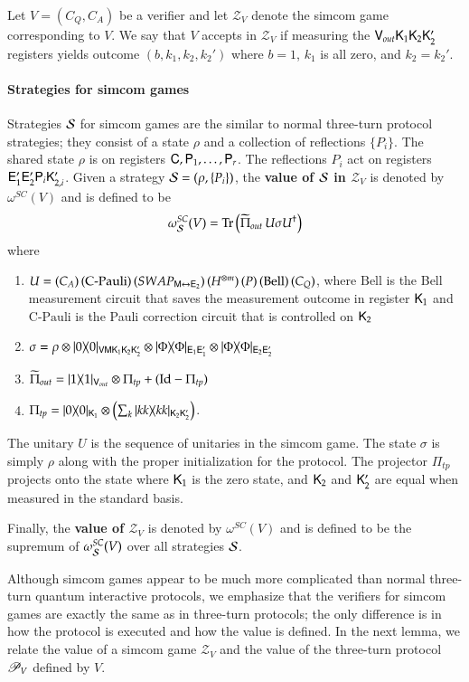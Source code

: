 Let $V = (C_Q,C_A)$ be a verifier and let $\mathscr{Z}_V$ denote the simcom game corresponding to $V$. We say that $V$ accepts in $\mathscr{Z}_V$ if measuring the ${\mathsf{V}}_{out} {\mathsf{K}}_1 {\mathsf{K}}_2 {\mathsf{K}}_2'$ registers yields outcome $(b,k_1,k_2,k_2')$ where $b = 1$, $k_1$ is all zero, and $k_2 = k_2'$. 

\paragraph{Strategies for simcom games} Strategies $\mathcal{S}$ for simcom games are the similar to normal three-turn protocol strategies; they consist of a state $\rho$ and a collection of reflections $\{ P_i \}$. The shared state $\rho$ is on registers ${\mathsf{C}}, {\mathsf{P}}_1,\ldots,{\mathsf{P}}_r$. The reflections $P_i$ act on registers ${\mathsf{E}}_1' {\mathsf{E}}_2' {\mathsf{P}}_i {\mathsf{K}}_{2,i}'$. Given a strategy $\mathcal{S} = (\rho,\{P_i\})$, the \textbf{value of $\mathcal{S}$ in $\mathscr{Z}_V$} is denoted by $\omega^{SC}(V)$ and is defined to be
\[
	\omega^{SC}_{\mathcal{S}}(V) = \operatorname{Tr} \left( \widetilde{\Pi}_{out} \, U \sigma U^\dagger\right)
\]
where
\begin{enumerate}
	\item $U =  (C_A) \,  (\text{C-Pauli}) \, (SWAP_{{\mathsf{M}} \leftrightarrow {\mathsf{E}}_2}) \, (H^{\otimes m}) \, (P)\, (\mathrm{Bell})\, (C_Q)$, where $\mathrm{Bell}$ is the Bell measurement circuit that saves the measurement outcome in register ${\mathsf{K}}_1$ and $\text{C-Pauli}$ is the Pauli correction circuit that is controlled on ${\mathsf{K}}_2$
	\item $\sigma = \rho \otimes |0\rangle\! \langle 0|_{{\mathsf{V}} {\mathsf{M}} {\mathsf{K}}_1 {\mathsf{K}}_2 {\mathsf{K}}_2'} \otimes |\Phi\rangle\! \langle \Phi|_{{\mathsf{E}}_1 {\mathsf{E}}_1'} \otimes |\Phi\rangle\! \langle \Phi|_{{\mathsf{E}}_2 {\mathsf{E}}_2'}$
	\item  $\widetilde{\Pi}_{out} = |1\rangle\! \langle 1|_{{\mathsf{V}}_{out}} \otimes \Pi_{tp} + (\mathop{\mathrm{Id}}\!\mathinner{} - \Pi_{tp})$
	\item $\Pi_{tp} = |0\rangle\! \langle 0|_{{\mathsf{K}}_1} \otimes \left( \sum_{k} |kk\rangle\! \langle kk|_{{\mathsf{K}}_2 {\mathsf{K}}_2'}\right)$.
\end{enumerate}
The unitary $U$ is the sequence of unitaries in the simcom game. The state $\sigma$ is simply $\rho$ along with the proper initialization for the protocol. The projector $\Pi_{tp}$ projects onto the state where ${\mathsf{K}}_1$ is the zero state, and ${\mathsf{K}}_2$ and ${\mathsf{K}}_2'$ are equal when measured in the standard basis.

Finally, the \textbf{value of $\mathscr{Z}_V$} is denoted by $\omega^{SC}(V)$ and is defined to be the supremum of $\omega^{SC}_{\mathcal{S}}(V)$ over all strategies $\mathcal{S}$.


Although simcom games appear to be much more complicated than normal three-turn quantum interactive protocols, we emphasize that the verifiers for simcom games are exactly the same as in three-turn protocols; the only difference is in how the protocol is executed and how the value is defined. In the next lemma, we relate the value of a simcom game $\mathscr{Z}_V$ and the value of the three-turn protocol $\mathscr{P}_V$ defined by $V$.

